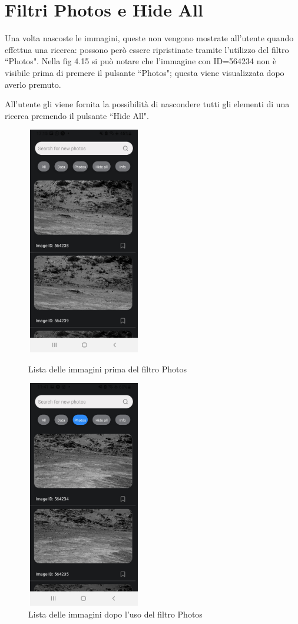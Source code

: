 \section*{Filtri Photos e Hide All}
Una volta nascoste le immagini, queste non vengono mostrate all'utente quando effettua una ricerca: possono per\`o essere ripristinate tramite l'utilizzo del filtro ``Photos".
Nella fig 4.15 si pu\`o notare che l'immagine con ID=564234 non \`e visibile prima di premere il pulsante ``Photos"; questa viene visualizzata dopo averlo premuto.

All'utente gli viene fornita la possibilit\`a di nascondere tutti gli elementi di una ricerca premendo il pulsante ``Hide All".
\begin{figure}[h]
    \begin{minipage}[h]{0.47\textwidth}
        \centering
        \includegraphics[width=5cm, height=10cm]{images/immaginiAndroid/prePhotos.jpg}
        \caption{\label{prePhotosAndroid} Lista delle immagini prima del filtro Photos}
    \end{minipage}
    \hfill
    \begin{minipage}[h]{0.47\textwidth}
        \centering
        \includegraphics[width=5cm, height=10cm]{images/immaginiAndroid/postPhotos.jpg}
        \caption{\label{postPhotosAndroid} Lista delle immagini dopo l'uso del filtro Photos}
    \end{minipage}
\end{figure}
